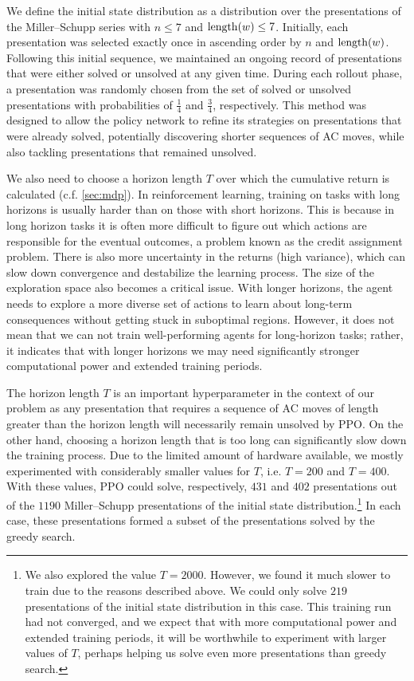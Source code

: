 We define the initial state distribution as a distribution over the presentations of the Miller--Schupp series with $n \leq 7$ and $\operatorname{length}(w) \leq 7$. Initially, each presentation was selected exactly once in ascending order by $n$ and $\operatorname{length}(w)$. Following this initial sequence, we maintained an ongoing record of presentations that were either solved or unsolved at any given time. During each rollout phase, a presentation was randomly chosen from the set of solved or unsolved presentations with probabilities of  $\frac{1}{4}$ and $\frac{3}{4}$, respectively. This method was designed to allow the policy network to refine its strategies on presentations that were already solved, potentially discovering shorter sequences of AC moves, while also tackling presentations that remained unsolved.

We also need to choose a horizon length $T$ over which the cumulative return is calculated (c.f. \autoref{sec:mdp}). In reinforcement learning, training on tasks with long horizons is usually harder than on those with short horizons. This is because in long horizon tasks it is often more difficult to figure out which actions are responsible for the eventual outcomes, a problem known as the credit assignment problem. There is also more uncertainty in the returns (high variance), which can slow down convergence and destabilize the learning process. The size of the exploration space also becomes a critical issue. With longer horizons, the agent needs to explore a more diverse set of actions to learn about long-term consequences without getting stuck in suboptimal regions. However, it does not mean that we can not train well-performing agents for long-horizon tasks; rather, it indicates that with longer horizons we may need significantly stronger computational power and extended training periods.

The horizon length $T$ is an important hyperparameter in the context of our problem as any presentation that requires a sequence of AC moves of length greater than the horizon length will necessarily remain unsolved by PPO. On the other hand, choosing a horizon length that is too long can significantly slow down the training process. Due to the limited amount of hardware available, we mostly experimented with considerably smaller values for $T$, i.e. $T=200$ and $T=400$.  With these values, PPO could solve, respectively, $431$ and $402$ presentations out of the $1190$ Miller--Schupp presentations of the initial state distribution.\footnote{We also explored the value $T=2000$. However, we found it much slower to train due to the reasons described above. We could only solve $219$ presentations of the initial state distribution in this case. This training run had not converged, and we expect that with more computational power and extended training periods, it will be worthwhile to experiment with larger values of $T$, perhaps helping us solve even more presentations than greedy search.}
In each case, these presentations formed a subset of the presentations solved by the greedy search.

